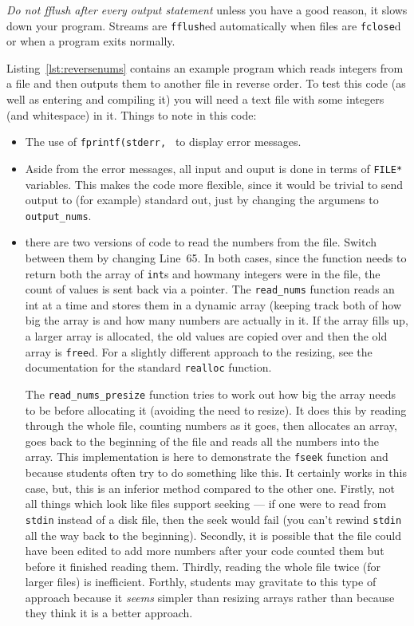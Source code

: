 \emph{Do not \emph{fflush} after every output statement} unless you have a good reason, it slows down your program.
Streams are \texttt{fflush}ed automatically when files are \texttt{fclose}d or when a program exits normally.

\hypertarget{disc:reversenums}{}Listing~\ref{lst:reversenums} contains an example program which reads integers from a file and then outputs them to another
file in reverse order.
To test this code (as well as entering and compiling it) you will need a text file with some integers (and whitespace) in it.
Things to note in this code:
\begin{itemize}
 \item The use of \lstinline!fprintf(stderr, ! to display error messages.
 \item Aside from the error messages, all input and ouput is done in terms of \texttt{FILE*} variables.
 This makes the code more flexible, since it would be trivial to send output to (for example) standard out, just
 by changing the argumens to \texttt{output\_nums}.
 \item there are two versions of code to read the numbers from the file.
 Switch between them by changing Line~65.
 In both cases, since the function needs to return both the array of \texttt{int}s and howmany integers were
 in the file, the count of values is sent back via a pointer.
 The \texttt{read\_nums} function reads an int at a time and stores them in a dynamic array (keeping track both of how big the array is
 and how many numbers are actually in it.
 If the array fills up, a larger array is allocated, the old values are copied over and then the old array is \texttt{free}d.
 For a slightly different approach to the resizing, see the documentation for the standard \texttt{realloc} function.
 
 The \texttt{read\_nums\_presize} function tries to work out how big the array needs to be before allocating it (avoiding the need to resize).
 It does this by reading through the whole file, counting numbers as it goes, then allocates an array, goes back to the beginning of the file
 and reads all the numbers into the array.
 This implementation is here to demonstrate the \texttt{fseek} function and because students often try to do something like this.
 It certainly works in this case, but, this is an inferior method compared to the other one.
 Firstly, not all things which look like files support seeking --- if one were to read from \texttt{stdin} instead of a disk file, then the seek would fail 
 (you can't rewind \texttt{stdin} all the way back to the beginning).
 Secondly, it is possible that the file could have been edited to add more numbers after your code counted them but before it finished reading them.
 Thirdly, reading the whole file twice (for larger files) is inefficient.
 Forthly, students may gravitate to this type of approach because it \emph{seems} simpler than resizing arrays rather than because they think it is a better approach.
 

\end{itemize}
